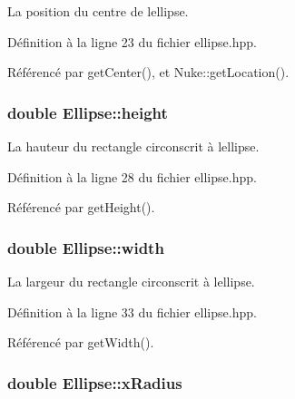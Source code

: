 La position du centre de l\textquotesingle{}ellipse. 



Définition à la ligne 23 du fichier ellipse.\+hpp.



Référencé par get\+Center(), et Nuke\+::get\+Location().

\hypertarget{classEllipse_a549345caaff869f7eef31c800e37dd38}{}
\subsubsection[{height}]{\setlength{\rightskip}{0pt plus 5cm}double Ellipse\+::height\hspace{0.3cm}{\ttfamily [protected]}}\label{classEllipse_a549345caaff869f7eef31c800e37dd38}


La hauteur du rectangle circonscrit à l\textquotesingle{}ellipse. 



Définition à la ligne 28 du fichier ellipse.\+hpp.



Référencé par get\+Height().

\hypertarget{classEllipse_a4f2fb4b634a1c37666a0f8419c4f6d39}{}
\subsubsection[{width}]{\setlength{\rightskip}{0pt plus 5cm}double Ellipse\+::width\hspace{0.3cm}{\ttfamily [protected]}}\label{classEllipse_a4f2fb4b634a1c37666a0f8419c4f6d39}


La largeur du rectangle circonscrit à l\textquotesingle{}ellipse. 



Définition à la ligne 33 du fichier ellipse.\+hpp.



Référencé par get\+Width().

\hypertarget{classEllipse_a8e0e2fa0f3200a997f4b0567e588c823}{}
\subsubsection[{x\+Radius}]{\setlength{\rightskip}{0pt plus 5cm}double Ellipse\+::x\+Radius\hspace{0.3cm}{\ttfamily [protected]}}\label{classEllipse_a8e0e2fa0f3200a997f4b0567e588c823}


